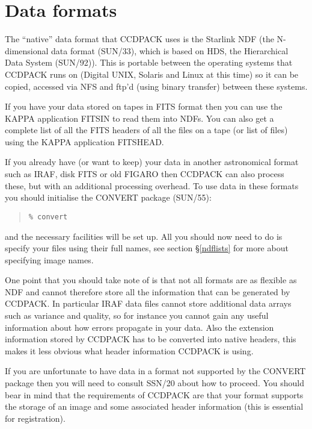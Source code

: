 \documentclass[twoside,11pt]{article}
\newcommand{\hyperref}[4]{#2\ref{#4}#3}
\newcommand{\xref}[3]{#1}
\newcommand{\xlabel}[1]{}
\renewcommand{\_}{\texttt{\symbol{95}}}
\newenvironment{myquote}{\begin{quote}\begin{small}}{\end{small}\end{quote}}
\begin{document}
\section{Data\label{datatypes} \xlabel{datatypes} formats}
The ``native'' data format that CCDPACK uses is the Starlink NDF (the
N-dimensional data format (\xref{SUN/33}{sun33}{}), which is based on
HDS, the Hierarchical Data System \xref{(SUN/92)}{sun92}{}).  This is
portable between the operating systems that CCDPACK runs on (Digital
UNIX, Solaris and Linux at this time) so it can be copied, accessed
via NFS and ftp'd (using binary transfer) between these systems.

If you have your data stored on tapes in FITS format then you can use
the \xref{KAPPA}{sun95}{} application \xref{FITSIN}{sun95}{FITSIN} to
read them into NDFs. You can also get a complete list of all the FITS
headers of all the files on a tape (or list of files) using the KAPPA
application \xref{FITSHEAD}{sun95}{FITSHEAD}.

If you already have (or want to keep) your data in another
astronomical format such as IRAF, disk FITS or old FIGARO then CCDPACK
can also process these, but with an additional processing overhead. To
use data in these formats you should initialise the CONVERT package
(\xref{SUN/55}{sun55}{}):
\begin{myquote}
\begin{verbatim}
% convert
\end{verbatim}
\end{myquote}
and the necessary facilities will be set up. All you should now need to
do is specify your files using their full names, see
\hyperref{later}{section \S}{}{ndflists} for more about specifying
image names.

One point that you should take note of is that not all formats are as
flexible as NDF and cannot therefore store all the information that
can be generated by CCDPACK. In particular IRAF data files cannot
store additional data arrays such as variance and quality, so for
instance you cannot gain any useful information about how errors
propagate in your data. Also the extension information stored by
CCDPACK has to be converted into native headers, this makes it less
obvious what header information CCDPACK is using.

If you are unfortunate to have data in a format not supported by the
CONVERT package then you will need to consult \xref{SSN/20}{ssn20}{}
about how to proceed. You should bear in mind that the requirements
of CCDPACK are that your format supports the storage of an image and
some associated header information (this is essential for registration).
\end{document}
